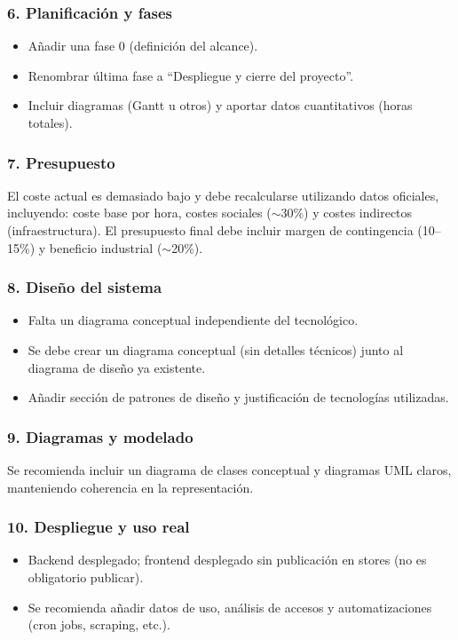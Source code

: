\subsubsection*{6. Planificación y fases}
\begin{itemize}
    \item Añadir una fase 0 (definición del alcance).
    \item Renombrar última fase a ``Despliegue y cierre del proyecto''.
    \item Incluir diagramas (Gantt u otros) y aportar datos cuantitativos (horas totales).
\end{itemize}

\subsubsection*{7. Presupuesto}
El coste actual es demasiado bajo y debe recalcularse utilizando datos oficiales, incluyendo: coste base por hora, costes sociales ($\sim$30\%) y costes indirectos (infraestructura). El presupuesto final debe incluir margen de contingencia (10--15\%) y beneficio industrial ($\sim$20\%).

\subsubsection*{8. Diseño del sistema}
\begin{itemize}
    \item Falta un diagrama conceptual independiente del tecnológico.
    \item Se debe crear un diagrama conceptual (sin detalles técnicos) junto al diagrama de diseño ya existente.
    \item Añadir sección de patrones de diseño y justificación de tecnologías utilizadas.
\end{itemize}

\subsubsection*{9. Diagramas y modelado}
Se recomienda incluir un diagrama de clases conceptual y diagramas UML claros, manteniendo coherencia en la representación.

\subsubsection*{10. Despliegue y uso real}
\begin{itemize}
    \item Backend desplegado; frontend desplegado sin publicación en stores (no es obligatorio publicar).
    \item Se recomienda añadir datos de uso, análisis de accesos y automatizaciones (cron jobs, scraping, etc.).
\end{itemize}

